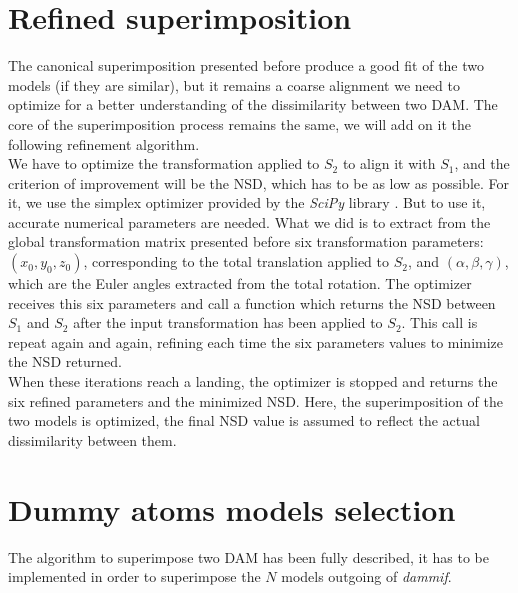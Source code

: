 \documentclass[a4paper, 11pt]{report}
\begin{document}
\section{Refined superimposition}

The canonical superimposition presented before produce a good fit of 
the two models (if they are similar), but it remains a coarse 
alignment we need to optimize for a better understanding of the 
dissimilarity between two DAM. 
The core of the superimposition process remains the same, we will add 
on it the following refinement algorithm.\\
 
We have to optimize the transformation applied to $S_{2}$ to align it 
with $S_{1}$, and the criterion of improvement will be the NSD, which 
has to be as low as possible. 
For it, we use the simplex optimizer provided by the \textit{SciPy} 
library \cite{scipy}. 
But to use it, accurate numerical parameters are needed. 
What we did is to extract from the global transformation matrix 
presented before six transformation parameters: 
$(x_{0}, y_{0}, z_{0})$, 
corresponding to the total translation applied to $S_{2}$, and 
$(\alpha, \beta, \gamma)$, 
which are the Euler angles extracted from the total rotation. 
The optimizer receives this six parameters and call a function which 
returns the NSD between $S_{1}$ and $S_{2}$ after the input 
transformation has been applied to $S_{2}$. 
This call is repeat again and again, refining each time the six 
parameters values to minimize the NSD returned.\\
When these iterations reach a landing, the optimizer is stopped and 
returns the six refined parameters and the minimized NSD. 
Here, the superimposition of the two models is optimized, the final 
NSD value is assumed to reflect the actual dissimilarity between them.\\

\section{Dummy atoms models selection}

The algorithm to superimpose two DAM has been fully described, it has 
to be implemented in order to superimpose the $N$ models outgoing of 
\textit{dammif}. \\
\end{document}
